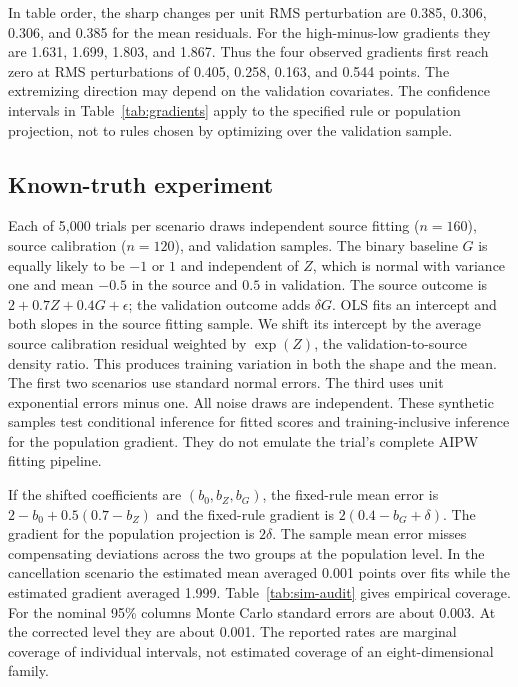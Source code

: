 In table order, the sharp changes per unit RMS perturbation are 0.385, 0.306, 0.306, and 0.385 for the mean residuals. For the high-minus-low gradients they are 1.631, 1.699, 1.803, and 1.867. Thus the four observed gradients first reach zero at RMS perturbations of 0.405, 0.258, 0.163, and 0.544 points. The extremizing direction may depend on the validation covariates. The confidence intervals in Table~\ref{tab:gradients} apply to the specified rule or population projection, not to rules chosen by optimizing over the validation sample.

\subsection{Known-truth experiment}
Each of 5,000 trials per scenario draws independent source fitting ($n=160$), source calibration ($n=120$), and validation samples. The binary baseline $G$ is equally likely to be $-1$ or $1$ and independent of $Z$, which is normal with variance one and mean $-0.5$ in the source and $0.5$ in validation. The source outcome is $2+0.7Z+0.4G+\epsilon$; the validation outcome adds $\delta G$. OLS fits an intercept and both slopes in the source fitting sample. We shift its intercept by the average source calibration residual weighted by $\exp(Z)$, the validation-to-source density ratio. This produces training variation in both the shape and the mean. The first two scenarios use standard normal errors. The third uses unit exponential errors minus one. All noise draws are independent. These synthetic samples test conditional inference for fitted scores and training-inclusive inference for the population gradient. They do not emulate the trial's complete AIPW fitting pipeline.

If the shifted coefficients are $(b_0,b_Z,b_G)$, the fixed-rule mean error is $2-b_0+0.5(0.7-b_Z)$ and the fixed-rule gradient is $2(0.4-b_G+\delta)$. The gradient for the population projection is $2\delta$. The sample mean error misses compensating deviations across the two groups at the population level. In the cancellation scenario the estimated mean averaged 0.001 points over fits while the estimated gradient averaged 1.999. Table~\ref{tab:sim-audit} gives empirical coverage. For the nominal 95\% columns Monte Carlo standard errors are about 0.003. At the corrected level they are about 0.001. The reported rates are marginal coverage of individual intervals, not estimated coverage of an eight-dimensional family.

